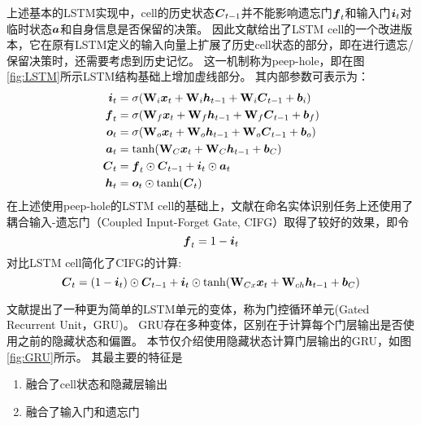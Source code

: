 上述基本的LSTM实现中，cell的历史状态$\boldsymbol{C}_{t-1}$并不能影响遗忘门$\boldsymbol{f}_t$和输入门$\boldsymbol{i}_t$对临时状态$\boldsymbol{a}$和自身信息是否保留的决策。
因此文献\citep{sak2014long}给出了LSTM cell的一个改进版本，它在原有LSTM定义的输入向量上扩展了历史cell状态的部分，即在进行遗忘/保留决策时，还需要考虑到历史记忆。
这一机制称为peep-hole，即在图\ref{fig:LSTM}所示LSTM结构基础上增加虚线部分。
其内部参数可表示为：
\begin{align}
    \boldsymbol{i}_t &= \sigma(\boldsymbol{\mathbf{W}}_{i}\boldsymbol{x}_{t} + \boldsymbol{\mathbf{W}}_{i}\boldsymbol{h}_{t-1} + \boldsymbol{\mathbf{W}}_{i}\boldsymbol{C}_{t-1} + \boldsymbol{b}_i)\\
    \boldsymbol{f}_t &= \sigma(\boldsymbol{\mathbf{W}}_{f}\boldsymbol{x}_{t} + \boldsymbol{\mathbf{W}}_{f}\boldsymbol{h}_{t-1} + \boldsymbol{\mathbf{W}}_{f}\boldsymbol{C}_{t-1} + \boldsymbol{b}_f)\\
    \boldsymbol{o}_t &= \sigma(\boldsymbol{\mathbf{W}}_{o}\boldsymbol{x}_{t} + \boldsymbol{\mathbf{W}}_{o}\boldsymbol{h}_{t-1} + \boldsymbol{\mathbf{W}}_{o}\boldsymbol{C}_{t-1} + \boldsymbol{b}_o)\\
    \boldsymbol{a}_t &= \tanh(\boldsymbol{\mathbf{W}}_{C}\boldsymbol{x}_t + \boldsymbol{\mathbf{W}}_{C}\boldsymbol{h}_{t-1} + \boldsymbol{b}_{C})\\
    \boldsymbol{C}_t &= \boldsymbol{f}_t\odot\boldsymbol{C}_{t-1} + \boldsymbol{i}_t\odot \boldsymbol{a}_t \\
    \boldsymbol{h}_t &= \boldsymbol{o}_t \odot \tanh(\boldsymbol{C}_t)
\end{align}
在上述使用peep-hole的LSTM cell的基础上，文献\citep{lample2016neural}在命名实体识别任务上还使用了耦合输入-遗忘门（Coupled Input-Forget Gate, CIFG）取得了较好的效果，即令
\begin{equation}
    \boldsymbol{f}_t = 1 - \boldsymbol{i}_t
\end{equation}
对比LSTM cell简化了CIFG的计算:
\begin{equation}
    \boldsymbol{C}_t = (1 - \boldsymbol{i}_t)\odot \boldsymbol{C}_{t-1} + \boldsymbol{i}_t\odot \tanh(\boldsymbol{\mathbf{W}}_{Cx}\boldsymbol{x}_t + \boldsymbol{\mathbf{W}}_{ch}\boldsymbol{h}_{t-1} + \boldsymbol{b}_C)
\end{equation}

文献\citep{cho2014learning}提出了一种更为简单的LSTM单元的变体，称为门控循环单元(Gated Recurrent Unit，GRU)。
GRU存在多种变体，区别在于计算每个门层输出是否使用之前的隐藏状态和偏置。
本节仅介绍使用隐藏状态计算门层输出的GRU，如图\ref{fig:GRU}所示。
其最主要的特征是
\begin{enumerate}
    \item 融合了cell状态和隐藏层输出
    \item 融合了输入门和遗忘门
\end{enumerate}

